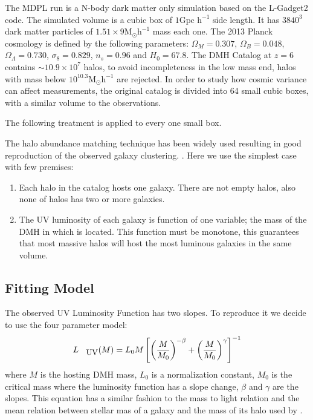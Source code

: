 \documentclass{emulateapj}
\begin{document}
The MDPL run is a N-body dark matter only simulation based on the L-Gadget2 
code. The simulated volume is a cubic box of $1 \textrm{Gpc h}^{-1}$ side length. 
It has $3840^3$ dark matter particles of  $1.51\times 9
\textrm{M}_{\odot} \textrm{h}^{-1}$ mass each one. The 2013 Planck
cosmology is defined by the following parameters: $\Omega_M = 0.307$,
$\Omega_B = 0.048$, $\Omega_\Lambda = 0.730$, $\sigma_8 = 0.829$, $n_s
= 0.96$ and  $H_0 = 67.8$. The DMH Catalog at $z=6$ contains $\sim
10.9 \times 10^7$   halos, to avoid incompleteness in the low mass
end, halos with mass below   $10^{10.3} \textrm{M}_{\odot}
\textrm{h}^{-1}$ are rejected. In order to study how  
cosmic variance can affect measurements, the original catalog is
divided into 64 small   cubic boxes, with a similar volume to the
observations. 

The following treatment is applied to every one small box.

The halo abundance matching technique has been widely used \citep{colin99, kravtsov04}
resulting in good reproduction of the observed galaxy clustering. \citep{conroy06, lee09}. 
Here we use the simplest case with few premises: 
\begin{enumerate}
 \item Each halo in the catalog hosts one galaxy. There are not empty
halos, also none of halos has two or more galaxies.
 \item The UV luminosity of each galaxy is function of one variable; the mass of
the DMH in which is located. This function must be monotone, this guarantees that most 
massive halos will host the most luminous galaxies in the same volume.
\end{enumerate}

\subsection{Fitting Model}

The observed UV Luminosity Function has two slopes. To reproduce it we decide to use the
 four parameter model:
  \begin{equation}\label{eqn:luminosity}
  L_{\textrm{\small{UV}}} (M) = L_{0} M \left[ \left( \frac{M}{M_0}\right)^{-\beta} 
		   + \left( \frac{M}{M_0}\right)^{\gamma} 
               \right]^{-1}
  \end{equation}
where $M$ is the hosting DMH mass, $L_{0}$ is a normalization constant, $M_0$
is the critical mass where the luminosity function has a slope change, 
$\beta$ and $\gamma$ are the slopes. This equation has a similar fashion to the
mass to light relation \citep{vandenbosch03} and the mean relation between
stellar mas of a galaxy and the mass of its halo used by \citet{moster10}.
\end{document}
